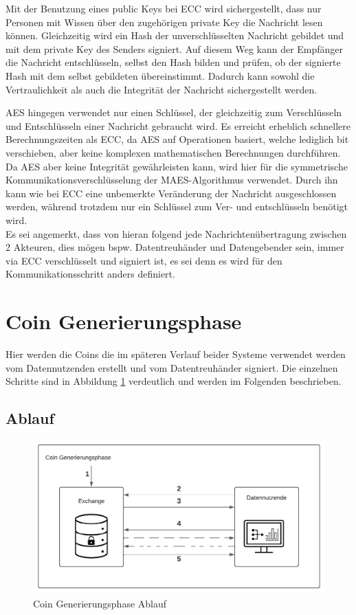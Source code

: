 \documentclass[11pt,a4paper]{scrreprt}
\begin{document}
Mit der Benutzung eines public Keys bei ECC wird sichergestellt, dass nur Personen mit Wissen über den zugehörigen private Key die Nachricht lesen können. Gleichzeitig wird ein Hash der unverschlüsselten Nachricht gebildet und mit dem private Key des Senders signiert. Auf diesem Weg kann der Empfänger die Nachricht entschlüsseln, selbst den Hash bilden und prüfen, ob der signierte Hash mit dem selbst gebildeten übereinstimmt. Dadurch kann sowohl die Vertraulichkeit als auch die Integrität der Nachricht sichergestellt werden.

AES hingegen verwendet nur einen Schlüssel, der gleichzeitig zum Verschlüsseln und Entschlüsseln einer Nachricht gebraucht wird. Es erreicht erheblich schnellere Berechnungszeiten als ECC, da AES auf Operationen basiert, welche lediglich bit verschieben, aber keine komplexen mathematischen Berechnungen durchführen. Da AES aber keine Integrität gewährleisten kann, wird hier für die symmetrische Kommunikationsverschlüsselung der MAES-Algorithmus verwendet. Durch ihn kann wie bei ECC eine unbemerkte Veränderung der Nachricht ausgeschlossen werden, während trotzdem nur ein Schlüssel zum Ver- und entschlüsseln benötigt wird.\\

Es sei angemerkt, dass von hieran folgend jede Nachrichtenübertragung zwischen 2 Akteuren, dies mögen bspw. Datentreuhänder und Datengebender sein, immer via ECC verschlüsselt und signiert ist, es sei denn es wird für den Kommunikationsschritt anders definiert.

\section{Coin Generierungsphase}
\label{system:coingeneration}
Hier werden die Coins die im späteren Verlauf beider Systeme verwendet werden vom Datennutzenden erstellt und vom Datentreuhänder signiert. Die einzelnen Schritte sind in Abbildung \ref{fig:coin-generationphase} verdeutlich und werden im Folgenden beschrieben.
\subsection{Ablauf}
\begin{figure}[H]
    \centering
    \includegraphics[width=0.9\linewidth]{CoinGenerationPhaseDiagramm.pdf}
    \caption{Coin Generierungsphase Ablauf}
    \label{fig:coin-generationphase}
\end{figure}
\end{document}
